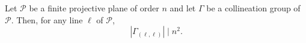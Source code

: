 Let $\mathcal{P}$ be a finite projective plane of order $n$ and let $\Gamma$ be a collineation group of $\mathcal{P}$. Then, for any line $\ell$ of $\mathcal{P}$,
$$|\Gamma_{(\ell,\ell)}| \mid n^2.$$
